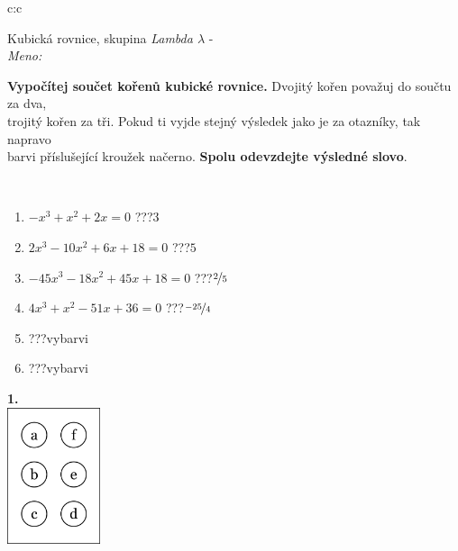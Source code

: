 \documentclass[10pt]{report}
\begin{document}
\begin{tabular}{c:c}
\begin{minipage}[c][104.5mm][t]{0.5\linewidth}
\begin{center}
\vspace{7mm}
{\huge Kubická rovnice, skupina \textit{Lambda $\lambda$} -}\\[5mm]
\textit{Meno:}\phantom{xxxxxxxxxxxxxxxxxxxxxxxxxxxxxxxxxxxxxxxxxxxxxxxxxxxxxxxxxxxxxxxxx}\\[5mm]
\begin{minipage}{0.95\linewidth}
\textbf{Vypočítej součet kořenů kubické rovnice.} Dvojitý kořen považuj do součtu za dva,\\trojitý kořen za tři. Pokud ti vyjde stejný výsledek jako je za otazníky, tak napravo\\barvi příslušející kroužek načerno. \textbf{Spolu odevzdejte výsledné slovo}.
\end{minipage}
\\[1mm]
\begin{minipage}{0.79\linewidth}
\begin{center}
\begin{varwidth}{\linewidth}
\begin{enumerate}
\Large
\item $-x^3+x^2+2x=0$\quad \dotfill\; ???\;\dotfill \quad $3$
\item $2x^3-10x^2+6x+18=0$\quad \dotfill\; ???\;\dotfill \quad $5$
\item $-45x^3-18x^2+45x+18=0$\quad \dotfill\; ???\;\dotfill \quad $\nicefrac{2}{5}$
\item $4x^3+x^2-51x+36=0$\quad \dotfill\; ???\;\dotfill \quad $\nicefrac{-25}{4}$
\item \quad \dotfill\; ???\;\dotfill \quad vybarvi
\item \quad \dotfill\; ???\;\dotfill \quad vybarvi
\end{enumerate}
\end{varwidth}
\end{center}
\end{minipage}
\begin{minipage}{0.20\linewidth}
\begin{center}
{\Huge\bfseries 1.} \\[2mm]
\includegraphics[height=40mm]{../images/braille.png}

\end{center}
\end{minipage}
\end{center}
\end{minipage}
\end{tabular}
\end{document}
